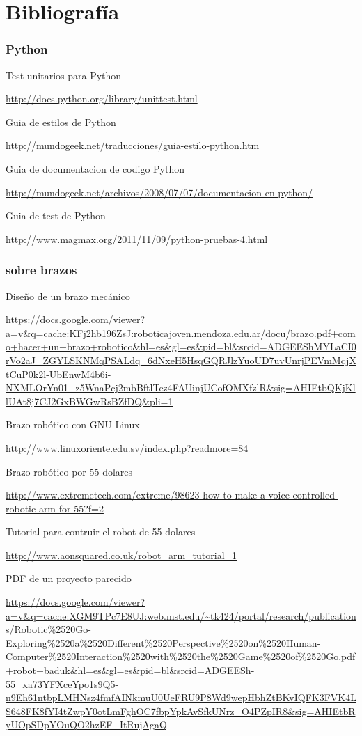 \documentclass[12pt,a4paper]{report}
\begin{document}
\chapter{Bibliografía}


\subsection{ Python }
Test unitarios para Python

\url{http://docs.python.org/library/unittest.html}

Guia de estilos de Python

\url{http://mundogeek.net/traducciones/guia-estilo-python.htm}

Guia de documentacion de codigo Python

\url{http://mundogeek.net/archivos/2008/07/07/documentacion-en-python/}

Guia de test de Python

\url{http://www.magmax.org/2011/11/09/python-pruebas-4.html}

\subsection{sobre brazos}

Diseño de un brazo mecánico

\url{https://docs.google.com/viewer?a=v&q=cache:KFj2hb196ZsJ:roboticajoven.mendoza.edu.ar/docu/brazo.pdf+como+hacer+un+brazo+robotico&hl=es&gl=es&pid=bl&srcid=ADGEEShMYLaCI0rVo2aJ_ZGYLSKNMqPSALdq_6dNxeH5HsqGQRJlzYuoUD7uvUnrjPEVmMqjXtCuP0k2l-UbEnwM4b6i-NXMLOrYn01_z5WnaPcj2mbBftlTez4FAUinjUCofOMXfzlR&sig=AHIEtbQKjKllUAt8j7CJ2GxBWGwRsBZfDQ&pli=1}

Brazo robótico con GNU  Linux

\url{http://www.linuxoriente.edu.sv/index.php?readmore=84}

Brazo robótico por 55 dolares

\url{http://www.extremetech.com/extreme/98623-how-to-make-a-voice-controlled-robotic-arm-for-55?f=2}

Tutorial para contruir el robot de 55 dolares

\url{http://www.aonsquared.co.uk/robot_arm_tutorial_1}

PDF de un proyecto parecido

\url{https://docs.google.com/viewer?a=v&q=cache:XGM9TPc7E8UJ:web.mst.edu/~tk424/portal/research/publications/Robotic%
}
\end{document}
